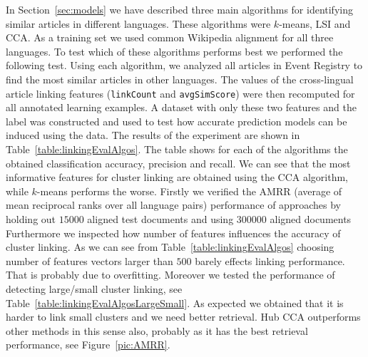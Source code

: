 \documentclass[twoside,11pt]{article}
\begin{document}
In Section~\ref{sec:models} we have described three main algorithms for identifying similar articles in different languages. These algorithms were $k$-means, LSI and CCA. As a training set we used common Wikipedia alignment for all three languages. To test which of these algorithms performs best we performed the following test. Using each algorithm, we analyzed all articles in Event Registry to find the most similar articles in other languages. The values of the cross-lingual article linking features (\texttt{linkCount} and \texttt{avgSimScore}) were then recomputed for all annotated learning examples. A dataset with only these two features and the label was constructed and used to test how accurate prediction models can be induced using the data. The results of the experiment are shown in Table~\ref{table:linkingEvalAlgos}. The table shows for each of the algorithms the obtained classification accuracy, precision and recall. We can see that the most informative features for cluster linking are obtained using the CCA algorithm, while $k$-means performs the worse. Firstly we verified the AMRR (average of mean reciprocal ranks over all language pairs) performance of approaches by holding out $15000$ aligned test documents and using $300000$ aligned documents
Furthermore we inspected how number of features influences the accuracy of cluster linking. As we can see from Table~\ref{table:linkingEvalAlgos} choosing number of features vectors larger than $500$ barely effects linking performance. That is probably due to overfitting. Moreover we tested the performance of detecting large/small cluster linking, see Table~\ref{table:linkingEvalAlgosLargeSmall}.  As expected we obtained that it is harder to link small clusters and we need better retrieval. Hub CCA outperforms other methods in this sense also, probably as it has the best retrieval performance, see Figure~\ref{pic:AMRR}.
\end{document}
